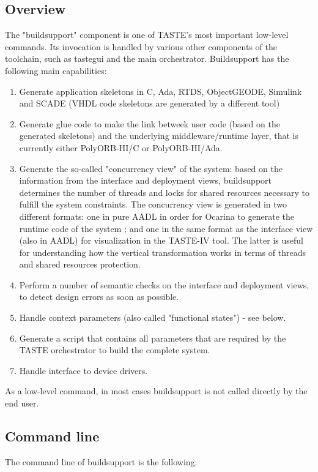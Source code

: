 \documentclass[11pt]{book}
\begin{document}
\subsection{Overview}
The "buildsupport" component is one of TASTE's most important low-level commands. Its invocation is handled by various other components of the toolchain, such as tastegui and the main orchestrator. Buildsupport  has the following main capabilities:
\begin{enumerate}
   \item
      Generate application skeletons in C, Ada, RTDS, ObjectGEODE, Simulink and SCADE (VHDL code skeletons are generated by a different tool)
   \item
      Generate glue code to make the link betweek user code (based on the generated skeletons) and the underlying middleware/runtime layer, that is currently either PolyORB-HI/C or PolyORB-HI/Ada.
   \item
      Generate the so-called "concurrency view" of the system: based on the information from the interface and deployment views, buildsupport determines the number of threads and locks for shared resources necessary to fulfill the system constraints. The concurrency view is generated in two different formats: one in pure AADL in order for Ocarina to generate the runtime code of the system ; and one in the same format as the interface view (also in AADL) for visualization in the TASTE-IV tool. The latter is useful for understanding how the vertical transformation works in terms of threads and shared resources protection.
   \item
      Perform a number of semantic checks on the interface and deployment views, to detect design errors as soon as possible.
   \item
      Handle context parameters (also called  "functional states") - see below.
   \item
      Generate a script that contains all parameters that are required by the TASTE orchestrator to build the complete system.
   \item
      Handle interface to device drivers.
\end{enumerate}
As a low-level command, in most cases buildsupport is not called directly by the end user.
\subsection{Command line}

The command line of buildsupport is the following:
\end{document}
